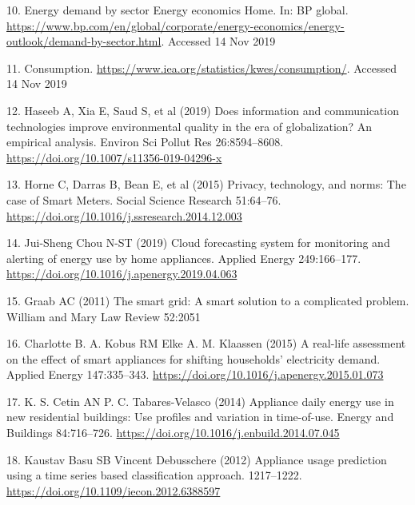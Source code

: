 \documentclass[11pt,]{article}
\begin{document}
\leavevmode\hypertarget{ref-EnergyDemandSector}{}%
10. Energy demand by sector \textbar{} Energy economics \textbar{} Home.
In: BP global.
\url{https://www.bp.com/en/global/corporate/energy-economics/energy-outlook/demand-by-sector.html}.
Accessed 14 Nov 2019

\leavevmode\hypertarget{ref-Consumption}{}%
11. Consumption. \url{https://www.iea.org/statistics/kwes/consumption/}.
Accessed 14 Nov 2019

\leavevmode\hypertarget{ref-haseebDoesInformationCommunication2019}{}%
12. Haseeb A, Xia E, Saud S, et al (2019) Does information and
communication technologies improve environmental quality in the era of
globalization? An empirical analysis. Environ Sci Pollut Res
26:8594--8608. \url{https://doi.org/10.1007/s11356-019-04296-x}

\leavevmode\hypertarget{ref-hornePrivacyTechnologyNorms2015}{}%
13. Horne C, Darras B, Bean E, et al (2015) Privacy, technology, and
norms: The case of Smart Meters. Social Science Research 51:64--76.
\url{https://doi.org/10.1016/j.ssresearch.2014.12.003}

\leavevmode\hypertarget{ref-jui-shengchouCloudForecastingSystem2019}{}%
14. Jui-Sheng Chou N-ST (2019) Cloud forecasting system for monitoring
and alerting of energy use by home appliances. Applied Energy
249:166--177. \url{https://doi.org/10.1016/j.apenergy.2019.04.063}

\leavevmode\hypertarget{ref-graabSmartGridSmart2011}{}%
15. Graab AC (2011) The smart grid: A smart solution to a complicated
problem. William and Mary Law Review 52:2051

\leavevmode\hypertarget{ref-charlotteb.a.kobusReallifeAssessmentEffect2015}{}%
16. Charlotte B. A. Kobus RM Elke A. M. Klaassen (2015) A real-life
assessment on the effect of smart appliances for shifting households'
electricity demand. Applied Energy 147:335--343.
\url{https://doi.org/10.1016/j.apenergy.2015.01.073}

\leavevmode\hypertarget{ref-k.s.cetinApplianceDailyEnergy2014}{}%
17. K. S. Cetin AN P. C. Tabares-Velasco (2014) Appliance daily energy
use in new residential buildings: Use profiles and variation in
time-of-use. Energy and Buildings 84:716--726.
\url{https://doi.org/10.1016/j.enbuild.2014.07.045}

\leavevmode\hypertarget{ref-kaustavbasuApplianceUsagePrediction2012}{}%
18. Kaustav Basu SB Vincent Debusschere (2012) Appliance usage
prediction using a time series based classification approach.
1217--1222. \url{https://doi.org/10.1109/iecon.2012.6388597}
\end{document}

